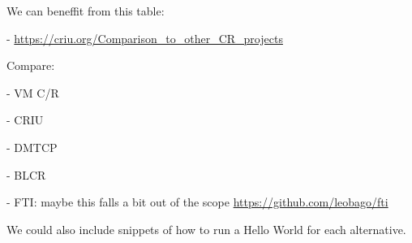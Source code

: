 We can beneffit from this table:

- \url{https://criu.org/Comparison_to_other_CR_projects}

Compare:

- VM C/R

- CRIU

- DMTCP

- BLCR

- FTI: maybe this falls a bit out of the scope \url{https://github.com/leobago/fti}

We could also include snippets of how to run a Hello World for each alternative.

